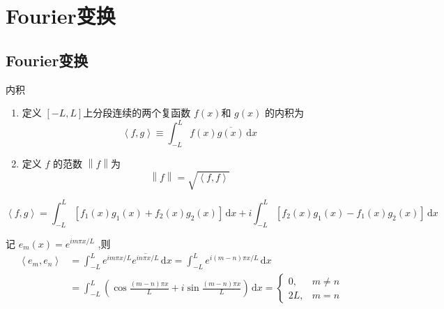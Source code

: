 \documentclass[../../main.tex]{subfiles}
\begin{document}
\ifSubfilesClassLoaded{
    \frontmatter

    \tableofcontents
    
    \mainmatter
}{}

\chapter{Fourier变换}
\section{Fourier变换}
\begin{definition}{内积}
    \begin{enumerate}
        \item 定义 \(  \left[ -L,L \right]   \)上分段连续的两个复函数 \(  f\left( x \right)   \)和  \(  g\left( x \right)   \)  的内积为 \[
\left<f,g \right>\equiv  \int_{-L}^{L} f\left( x \right) \overline{g\left( x \right) }\,\mathrm{d} x 
\]
\item 定义 \(  f  \) 的范数 \(  \left\| f \right\|  \)为 \[
\left\| f \right\|= \sqrt{\left<f,f \right>}
\] 
    \end{enumerate}
    
\end{definition}
\begin{remark}
     \[
     \left<f,g \right>=   \int_{-L}^{L}\left[ f_1\left( x \right)g_1\left( x \right)+ f_2\left( x \right)g_2\left( x \right)     \right]\,\mathrm{d} x + i \int_{-L}^{L}\left[ f_2\left( x \right)g_1\left( x \right)-f_1\left( x \right)g_2\left( x \right)     \right]\,\mathrm{d} x 
     \]
\end{remark}

\begin{theorem}
    记 \(  e_{m}\left( x \right)= e^{im \pi x/L}   \) ,则 \[
  \begin{aligned}
  \left<e_{m},e_{n} \right>&=  \int_{-L}^{L}e^{im\pi  x /{L}} \overline{e^{in\pi x /L}} \,\mathrm{d} x = \int_{-L}^{L}e^{i\left( m-n \right) \pi  x/L }\,\mathrm{d} x\\ 
   &=  \int_{-L}^{L} \left( \cos \frac{\left( m-n \right)\pi x  }{ L} + i \sin \frac{\left( m-n \right)\pi x  }{L }  \right)\,\mathrm{d} x= \begin{cases} 0,&m\neq n\\ 
    2L,&m= n \end{cases}  
  \end{aligned}
    \]

\end{theorem}
\end{document}
